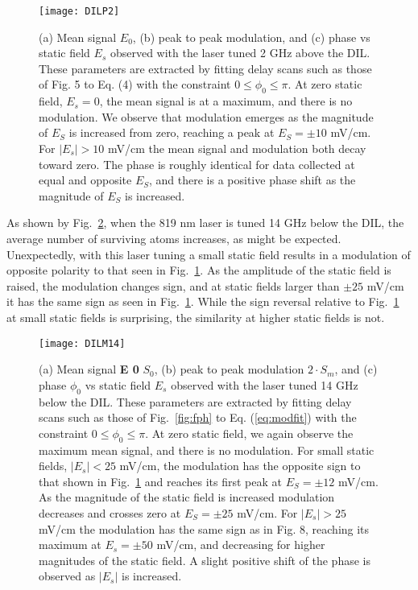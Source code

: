 \documentclass[aps,pra,preprint,groupedaddress]{revtex4-1}
\begin{document}
\begin{figure}
	\texttt{[image: DILP2]}
	\caption{(a) Mean signal $E_0$, (b) peak to peak modulation, and (c) phase vs static field $E_s$ observed with the laser tuned 2 GHz above the DIL. These parameters are extracted by fitting delay scans such as those of Fig. 5 to Eq. (4) with the constraint $0\leq\phi_0\leq\pi$. At zero static field, $E_s=0$, the mean signal is at a maximum, and there is no modulation. We observe that modulation emerges as the magnitude of $E_S$ is increased from zero, reaching a peak at $E_S = \pm 10$ mV/cm. For $|E_s|>10$ mV/cm the mean signal and modulation both decay toward zero. The phase is roughly identical for data collected at equal and opposite $E_S$, and there is a positive phase shift as the magnitude of $E_S$ is increased.}
	\label{fig:DILP2}
\end{figure}


As shown by Fig.~\ref{fig:DILM14}, when the 819 nm laser is tuned 14 GHz below the DIL, the average number of surviving atoms increases, as might be expected. Unexpectedly, with this laser tuning a small static field results in a modulation of opposite polarity to that seen in Fig.~\ref{fig:DILP2}. As the amplitude of the static field is raised, the modulation changes sign, and at static fields larger than $\pm25$ mV/cm it has the same sign as seen in Fig.~\ref{fig:DILP2}. While the sign reversal relative to Fig.~\ref{fig:DILP2} at small static fields is surprising, the similarity at higher static fields is not.


\begin{figure}
	\texttt{[image: DILM14]}
	\caption{(a) Mean signal \textbf{E 0} $S_0$, (b) peak to peak modulation $2 \cdot S_m$, and (c) phase $\phi_0$ vs static field $E_s$ observed with the laser tuned 14 GHz below the DIL. These parameters are extracted by fitting delay scans such as those of Fig.~\ref{fig:fph} to Eq. (\ref{eq:modfit}) with the constraint $0\leq\phi_0\leq\pi$. At zero static field, we again observe the maximum mean signal, and there is no modulation. For small static fields, $|E_s|<25$ mV/cm, the modulation has the opposite sign to that shown in Fig.~\ref{fig:DILP2} and reaches its first peak at $E_S = \pm 12$ mV/cm. As the magnitude of the static field is increased modulation decreases and crosses zero at $E_S = \pm 25$ mV/cm. For $|E_s|> 25$mV/cm the modulation has the same sign as in Fig. 8, reaching its maximum at $E_s=\pm50$ mV/cm, and decreasing for higher magnitudes of the static field. A slight positive shift of the phase is observed as $|E_s|$ is increased.}
	\label{fig:DILM14}
\end{figure}
\end{document}
